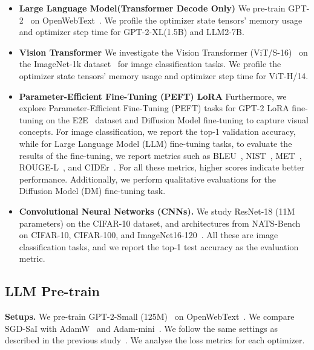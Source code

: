 \begin{itemize}
    \item \textbf{Large Language Model(Transformer Decode Only)} We pre-train GPT-2~\cite{radford2019language} on OpenWebText~\cite{Gokaslan2019OpenWeb}. We profile the optimizer state tensors' memory usage and optimizer step time for GPT-2-XL(1.5B) and LLM2-7B.
    \item \textbf{Vision Transformer} We investigate the Vision Transformer (ViT/S-16)~\cite{dosovitskiy2021imageworth16x16words} on the ImageNet-1k dataset~\cite{deng2009imagenet} for image classification tasks.  We profile the optimizer state tensors' memory usage and optimizer step time for ViT-H/14.
    \item \textbf{Parameter-Efficient Fine-Tuning (PEFT) LoRA} Furthermore, we explore Parameter-Efficient Fine-Tuning (PEFT) tasks for GPT-2 LoRA\cite{hu2021lora} fine-tuning on the E2E~\cite{novikova2017e2e} dataset and Diffusion Model fine-tuning to capture visual concepts. For image classification, we report the top-1 validation accuracy, while for Large Language Model (LLM) fine-tuning tasks, to evaluate the results of the fine-tuning, we report metrics such as BLEU~\cite{papineni2002bleu}, NIST~\cite{doddington2002automatic}, MET~\cite{banerjee2005meteor}, ROUGE-L~\cite{lin2004rouge}, and CIDEr~\cite{vedantam2015cider}. For all these metrics, higher scores indicate better performance. Additionally, we perform qualitative evaluations for the Diffusion Model (DM) fine-tuning task.
    \item \textbf{Convolutional Neural Networks (CNNs).} We study ResNet-18 (11M parameters) on the CIFAR-10 dataset, and architectures from NATS-Bench~\cite{dong2021nats} on CIFAR-10, CIFAR-100, and ImageNet16-120~\cite{krizhevsky2009learning, chrabaszcz2017downsampled}. All these are image classification tasks, and we report the top-1 test accuracy as the evaluation metric. 
\end{itemize}


\subsection{LLM Pre-train}\label{sec:exp:pretrain_llm}
\textbf{Setups.} 
We pre-train GPT-2-Small (125M)~\cite{radford2019language} on OpenWebText~\cite{Gokaslan2019OpenWeb}. We compare SGD-SaI with AdamW~\cite{loshchilov2019decoupled} and Adam-mini~\cite{zhang2024adamminiusefewerlearning}. We follow the same settings as described in the previous study~\cite{zhang2024adamminiusefewerlearning}. We analyse the loss metrics for each optimizer. 

